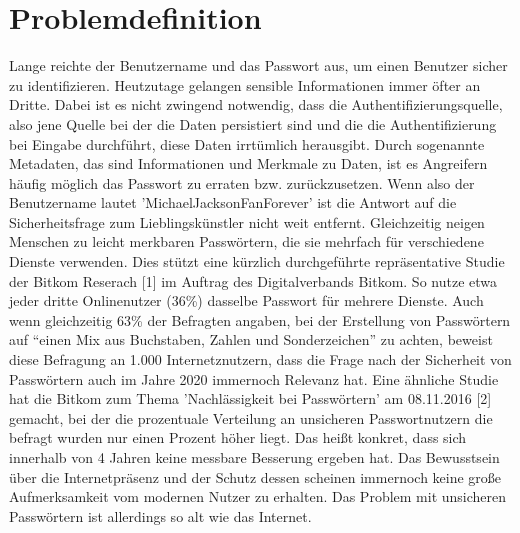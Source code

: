 \section{Problemdefinition}
Lange reichte der Benutzername und das Passwort aus, um einen Benutzer sicher zu identifizieren. Heutzutage gelangen sensible Informationen immer öfter an Dritte. Dabei ist es nicht zwingend notwendig, dass die Authentifizierungsquelle, also jene Quelle bei der die Daten persistiert sind und die die Authentifizierung bei Eingabe durchführt, diese Daten irrtümlich herausgibt. Durch sogenannte Metadaten, das sind Informationen und Merkmale zu Daten, ist es Angreifern häufig möglich das Passwort zu erraten bzw. zurückzusetzen. Wenn also der Benutzername lautet 'MichaelJacksonFanForever' ist die Antwort auf die Sicherheitsfrage zum Lieblingskünstler nicht weit entfernt.
Gleichzeitig neigen Menschen zu leicht merkbaren Passwörtern, die sie mehrfach für verschiedene Dienste verwenden. Dies stützt eine kürzlich durchgeführte repräsentative Studie der Bitkom Reserach [1] im Auftrag des Digitalverbands Bitkom. So nutze etwa jeder dritte Onlinenutzer (36\%) dasselbe Passwort für mehrere Dienste. Auch wenn gleichzeitig 63\% der Befragten angaben, bei der Erstellung von Passwörtern auf ``einen Mix aus Buchstaben, Zahlen und Sonderzeichen'' zu achten, beweist diese Befragung an 1.000 Internetznutzern, dass die Frage nach der Sicherheit von Passwörtern auch im Jahre 2020 immernoch Relevanz hat. Eine ähnliche Studie hat die Bitkom zum Thema 'Nachlässigkeit bei Passwörtern' am 08.11.2016 [2] gemacht, bei der die prozentuale Verteilung an unsicheren Passwortnutzern die befragt wurden nur einen Prozent höher liegt. Das heißt konkret, dass sich innerhalb von 4 Jahren keine messbare Besserung ergeben hat. Das Bewusstsein über die Internetpräsenz und der Schutz dessen scheinen immernoch keine große Aufmerksamkeit vom modernen Nutzer zu erhalten. Das Problem mit unsicheren Passwörtern ist allerdings so alt wie das Internet.

